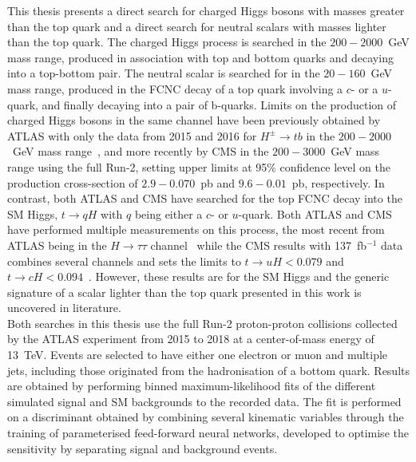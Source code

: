 This thesis presents a direct search for charged Higgs bosons with masses greater than the top quark and a direct search for neutral scalars with masses lighter than the top quark. The charged Higgs process is searched in the $200-2000$~GeV mass range, produced in association with top and bottom quarks and decaying into a top-bottom pair. The neutral scalar is searched for in the $20-160$~GeV mass range, produced in the FCNC decay of a top quark involving a $c$- or a $u$-quark, and finally decaying into a pair of b-quarks. Limits on the production of charged Higgs bosons in the same channel have been previously obtained by ATLAS with only the data from 2015 and 2016 for $H^\pm\to tb$ in the $200-2000$~GeV mass range~\cite{ATLASHptb2018}, and more recently by CMS in the $200-3000$~GeV mass range using the full Run-2, setting upper limits at 95\% confidence level on the production cross-section of $2.9-0.070$~pb and $9.6-0.01$~pb, respectively. In contrast, both ATLAS and CMS have searched for the top FCNC decay into the SM Higgs, $t\to qH$ with $q$ being either a $c$- or $u$-quark. Both ATLAS and CMS have performed multiple measurements on this process, the most recent from ATLAS being in the $H\to\tau\tau$ channel~\cite{ATLAStqHtautau} while the CMS results with 137~fb$^{-1}$ data combines several channels and sets the limits to $t\to uH < 0.079$ and $t\to cH < 0.094$~\cite{CMStqHRun2}. However, these results are for the SM Higgs and the generic signature of a scalar lighter than the top quark presented in this work is uncovered in literature.\\

Both searches in this thesis use the full Run-2 proton-proton collisions collected by the ATLAS experiment from 2015 to 2018 at a center-of-mass energy of 13~TeV. Events are selected to have either one electron or muon and multiple jets, including those originated from the hadronisation of a bottom quark. Results are obtained by performing binned maximum-likelihood fits of the different simulated signal and SM backgrounds to the recorded data. The fit is performed on a discriminant obtained by combining several kinematic variables through the training of parameterised feed-forward neural networks, developed to optimise the sensitivity by separating signal and background events.\\

